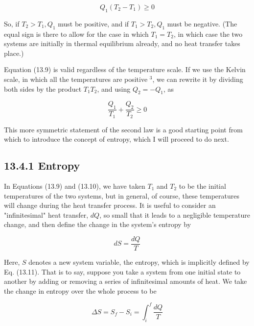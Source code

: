 \documentclass[10pt]{article}
\begin{document}
\begin{equation*}
Q_{1}\left(T_{2}-T_{1}\right) \geq 0 \tag{13.9}
\end{equation*}


So, if $T_{2}>T_{1}, Q_{1}$ must be positive, and if $T_{1}>T_{2}, Q_{1}$ must be negative. (The equal sign is there to allow for the case in which $T_{1}=T_{2}$, in which case the two systems are initially in thermal equilibrium already, and no heat transfer takes place.)

Equation (13.9) is valid regardless of the temperature scale. If we use the Kelvin scale, in which all the temperatures are positive ${ }^{3}$, we can rewrite it by dividing both sides by the product $T_{1} T_{2}$, and using $Q_{2}=-Q_{1}$, as


\begin{equation*}
\frac{Q_{1}}{T_{1}}+\frac{Q_{2}}{T_{2}} \geq 0 \tag{13.10}
\end{equation*}


This more symmetric statement of the second law is a good starting point from which to introduce the concept of entropy, which I will proceed to do next.

\subsection*{13.4.1 Entropy}
In Equations (13.9) and (13.10), we have taken $T_{1}$ and $T_{2}$ to be the initial temperatures of the two systems, but in general, of course, these temperatures will change during the heat transfer process. It is useful to consider an "infinitesimal" heat transfer, $d Q$, so small that it leads to a negligible temperature change, and then define the change in the system's entropy by


\begin{equation*}
d S=\frac{d Q}{T} \tag{13.11}
\end{equation*}


Here, $S$ denotes a new system variable, the entropy, which is implicitly defined by Eq. (13.11). That is to say, suppose you take a system from one initial state to another by adding or removing a series of infinitesimal amounts of heat. We take the change in entropy over the whole process to be


\begin{equation*}
\Delta S=S_{f}-S_{i}=\int_{i}^{f} \frac{d Q}{T} \tag{13.12}
\end{equation*}
\end{document}
